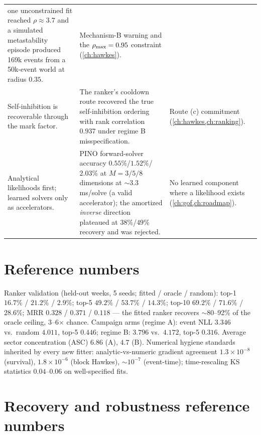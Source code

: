 \begin{longtable}{p{} p{} p{}}
one unconstrained fit reached $\rho \approx 3.7$ and a simulated
metastability episode produced 169k events from a 50k-event world at
radius $0.35$. & Mechanism-B warning and the $\rho_{\max} = 0.95$
constraint (\cref{ch:hawkes}). \\
\addlinespace
Self-inhibition is recoverable through the mark factor. & The ranker's
cooldown route recovered the true self-inhibition ordering with rank
correlation $0.937$ under regime B misspecification. & Route (c)
commitment (\cref{ch:hawkes,ch:ranking}). \\
\addlinespace
Analytical likelihoods first; learned solvers only as accelerators. &
PINO forward-solver accuracy $0.55\%$/$1.52\%$/$2.03\%$ at $M=3/5/8$
dimensions at $\sim$3.3 ms/solve (a valid accelerator); the amortized
\emph{inverse} direction plateaued at $38\%$/$49\%$ recovery and was
rejected. & No learned component where a likelihood exists
(\cref{ch:gof,ch:roadmap}). \\
\bottomrule
\end{longtable}

\section*{Reference numbers}

Ranker validation (held-out weeks, 5 seeds; fitted / oracle / random):
top-1 $16.7\%$ / $21.2\%$ / $2.9\%$; top-5 $49.2\%$ / $53.7\%$ /
$14.3\%$; top-10 $69.2\%$ / $71.6\%$ / $28.6\%$; MRR $0.328$ / $0.371$
/ $0.118$ --- the fitted ranker recovers $\sim$80--92\% of the oracle
ceiling, 3--6$\times$ chance. Campaign arms (regime A): event NLL
$3.346$ vs.\ random $4.011$, top-5 $0.446$; regime B: $3.796$ vs.\
$4.172$, top-5 $0.316$. Average sector concentration (ASC) $6.86$ (A),
$4.7$ (B). Numerical hygiene standards inherited by every new fitter:
analytic-vs-numeric gradient agreement $1.3\times 10^{-8}$ (survival),
$1.8\times 10^{-6}$ (block Hawkes), $\sim 10^{-7}$ (event-time);
time-rescaling KS statistics $0.04$--$0.06$ on well-specified fits.

\section*{Recovery and robustness reference numbers}

